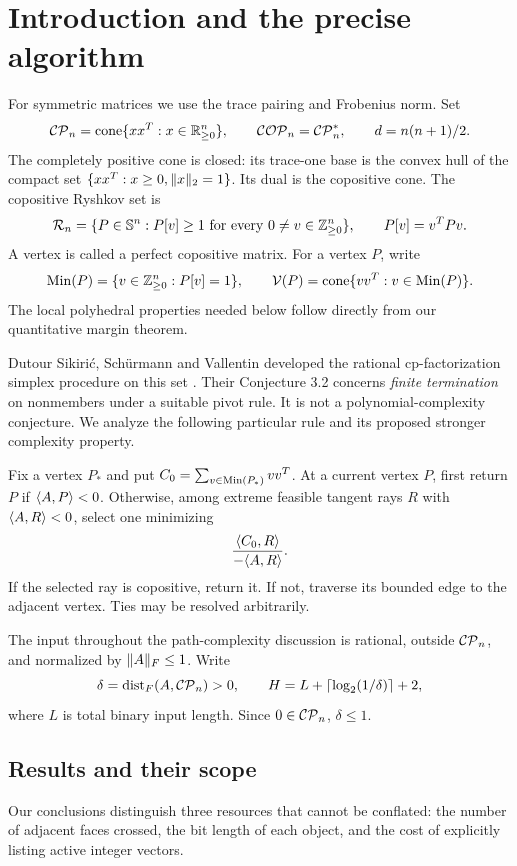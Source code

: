 \section{Introduction and the precise algorithm}
For symmetric matrices we use the trace pairing and Frobenius norm. Set
\[
\mathcal{CP}_n=\operatorname{cone}\{xx^T:x\in\mathbb R^n_{\ge0}\},\qquad
\mathcal{COP}_n=\mathcal{CP}_n^*,\qquad d=n(n+1)/2.
\]
The completely positive cone is closed: its trace-one base is the convex hull of the compact set $\{xx^T:x\ge0,\lVert x\rVert_2=1\}$. Its dual is the copositive cone. The copositive Ryshkov set is
\begin{equation}\label{eq:ry}
\mathcal R_n=\{P\in\mathbb S^n:P[v]\ge1\text{ for every }0\ne v\in\mathbb Z^n_{\ge0}\},\qquad P[v]=v^TPv.
\end{equation}
A vertex is called a perfect copositive matrix. For a vertex $P$, write
\[
\operatorname{Min}(P)=\{v\in\mathbb Z^n_{\ge0}:P[v]=1\},\qquad
\mathcal V(P)=\operatorname{cone}\{vv^T:v\in\operatorname{Min}(P)\}.
\]
The local polyhedral properties needed below follow directly from our quantitative margin theorem.

Dutour Sikiri\'c, Sch\"urmann and Vallentin developed the rational cp-factorization simplex procedure on this set \cite{DSV21}. Their Conjecture 3.2 concerns \emph{finite termination} on nonmembers under a suitable pivot rule. It is not a polynomial-complexity conjecture. We analyze the following particular rule and its proposed stronger complexity property.

\begin{definition}\label{def:rule}
Fix a vertex $P_*$ and put $C_0=\sum_{v\in\operatorname{Min}(P_*)}vv^T$. At a current vertex $P$, first return $P$ if $\langle A,P\rangle<0$. Otherwise, among extreme feasible tangent rays $R$ with $\langle A,R\rangle<0$, select one minimizing
\begin{equation}\label{eq:ratio}
\frac{\langle C_0,R\rangle}{-\langle A,R\rangle}.
\end{equation}
If the selected ray is copositive, return it. If not, traverse its bounded edge to the adjacent vertex. Ties may be resolved arbitrarily.
\end{definition}
The input throughout the path-complexity discussion is rational, outside $\mathcal{CP}_n$, and normalized by $\lVert A\rVert_F\le1$. Write
\begin{equation}\label{eq:H}
\delta=\operatorname{dist}_F(A,\mathcal{CP}_n)>0,\qquad H=L+\lceil\log_2(1/\delta)\rceil+2,
\end{equation}
where $L$ is total binary input length. Since $0\in\mathcal{CP}_n$, $\delta\le1$.

\subsection{Results and their scope}
Our conclusions distinguish three resources that cannot be conflated: the number of adjacent faces crossed, the bit length of each object, and the cost of explicitly listing active integer vectors.

